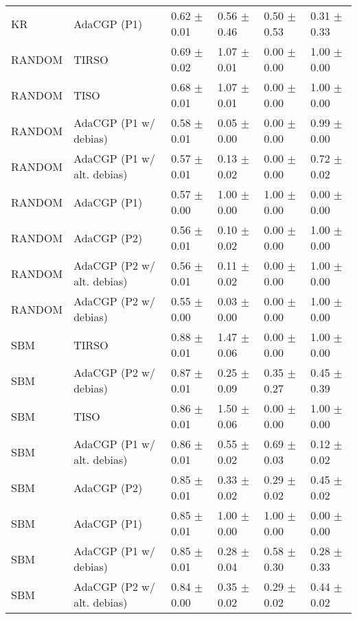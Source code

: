 \begin{tabular}{llllll}
KR     &                 AdaCGP (P1) &  0.62 $\pm$ 0.01 &  0.56 $\pm$ 0.46 &  0.50 $\pm$ 0.53 &  0.31 $\pm$ 0.33 \\
RANDOM &                       TIRSO &  0.69 $\pm$ 0.02 &  1.07 $\pm$ 0.01 &  0.00 $\pm$ 0.00 &  1.00 $\pm$ 0.00 \\
RANDOM &                        TISO &  0.68 $\pm$ 0.01 &  1.07 $\pm$ 0.01 &  0.00 $\pm$ 0.00 &  1.00 $\pm$ 0.00 \\
RANDOM &       AdaCGP (P1 w/ debias) &  0.58 $\pm$ 0.01 &  0.05 $\pm$ 0.00 &  0.00 $\pm$ 0.00 &  0.99 $\pm$ 0.00 \\
RANDOM &  AdaCGP (P1 w/ alt. debias) &  0.57 $\pm$ 0.01 &  0.13 $\pm$ 0.02 &  0.00 $\pm$ 0.00 &  0.72 $\pm$ 0.02 \\
RANDOM &                 AdaCGP (P1) &  0.57 $\pm$ 0.00 &  1.00 $\pm$ 0.00 &  1.00 $\pm$ 0.00 &  0.00 $\pm$ 0.00 \\
RANDOM &                 AdaCGP (P2) &  0.56 $\pm$ 0.01 &  0.10 $\pm$ 0.02 &  0.00 $\pm$ 0.00 &  1.00 $\pm$ 0.00 \\
RANDOM &  AdaCGP (P2 w/ alt. debias) &  0.56 $\pm$ 0.01 &  0.11 $\pm$ 0.02 &  0.00 $\pm$ 0.00 &  1.00 $\pm$ 0.00 \\
RANDOM &       AdaCGP (P2 w/ debias) &  0.55 $\pm$ 0.00 &  0.03 $\pm$ 0.00 &  0.00 $\pm$ 0.00 &  1.00 $\pm$ 0.00 \\
SBM    &                       TIRSO &  0.88 $\pm$ 0.01 &  1.47 $\pm$ 0.06 &  0.00 $\pm$ 0.00 &  1.00 $\pm$ 0.00 \\
SBM    &       AdaCGP (P2 w/ debias) &  0.87 $\pm$ 0.01 &  0.25 $\pm$ 0.09 &  0.35 $\pm$ 0.27 &  0.45 $\pm$ 0.39 \\
SBM    &                        TISO &  0.86 $\pm$ 0.01 &  1.50 $\pm$ 0.06 &  0.00 $\pm$ 0.00 &  1.00 $\pm$ 0.00 \\
SBM    &  AdaCGP (P1 w/ alt. debias) &  0.86 $\pm$ 0.01 &  0.55 $\pm$ 0.02 &  0.69 $\pm$ 0.03 &  0.12 $\pm$ 0.02 \\
SBM    &                 AdaCGP (P2) &  0.85 $\pm$ 0.01 &  0.33 $\pm$ 0.02 &  0.29 $\pm$ 0.02 &  0.45 $\pm$ 0.02 \\
SBM    &                 AdaCGP (P1) &  0.85 $\pm$ 0.01 &  1.00 $\pm$ 0.00 &  1.00 $\pm$ 0.00 &  0.00 $\pm$ 0.00 \\
SBM    &       AdaCGP (P1 w/ debias) &  0.85 $\pm$ 0.01 &  0.28 $\pm$ 0.04 &  0.58 $\pm$ 0.30 &  0.28 $\pm$ 0.33 \\
SBM    &  AdaCGP (P2 w/ alt. debias) &  0.84 $\pm$ 0.00 &  0.35 $\pm$ 0.02 &  0.29 $\pm$ 0.02 &  0.44 $\pm$ 0.02 \\
\bottomrule
\end{tabular}
